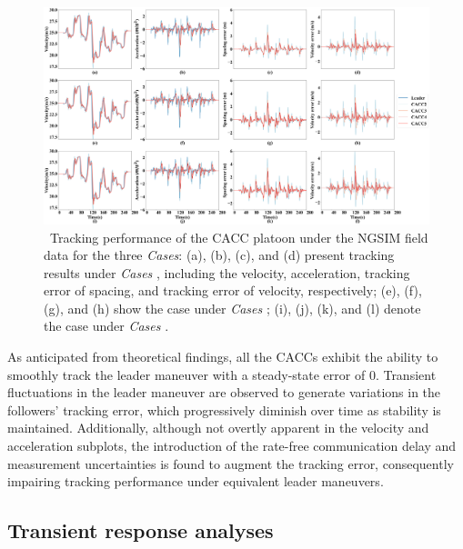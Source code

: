 \documentclass[a4paper]{cas-sc}
\begin{document}
\begin{figure}
  \centering
  \includegraphics[width=\textwidth]{figs/fig3.png}
  \caption
  {~Tracking performance of the CACC platoon under the NGSIM field data for the three \textit{Cases}: (a), (b), (c), and (d) present tracking results under \textit{Cases \uppercase\expandafter{}}, including the velocity, acceleration, tracking error of spacing, and tracking error of velocity, respectively; (e), (f), (g), and (h) show the case under \textit{Cases \uppercase\expandafter{}}; (i), (j), (k), and (l) denote the case under \textit{Cases \uppercase\expandafter{}}.} 
  \label{fig3}
\end{figure}

As anticipated from theoretical findings, all the CACCs exhibit the ability to smoothly track the leader maneuver with a steady-state error of 0. Transient fluctuations in the leader maneuver are observed to generate variations in the followers' tracking error, which progressively diminish over time as stability is maintained. Additionally, although not overtly apparent in the velocity and acceleration subplots, the introduction of the rate-free communication delay and measurement uncertainties is found to augment the tracking error, consequently impairing tracking performance under equivalent leader maneuvers.






\subsection{Transient response analyses}
\label{Section 5.3}
\end{document}
